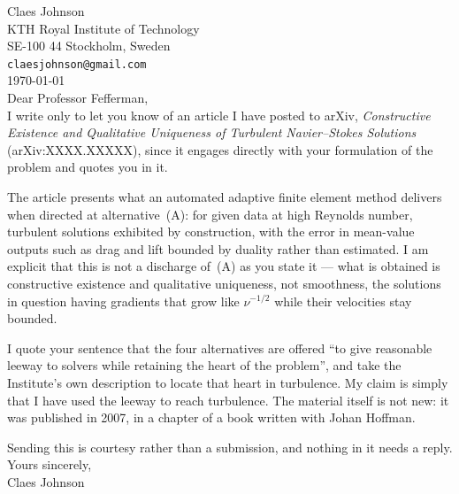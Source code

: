 \documentclass[11pt]{article}
\begin{document}
\noindent
Claes Johnson\\
KTH Royal Institute of Technology\\
SE-100 44 Stockholm, Sweden\\
\texttt{claesjohnson@gmail.com}\\[1.2em]
\today\\[1.6em]

\noindent Dear Professor Fefferman,\\[0.6em]

I write only to let you know of an article I have posted to arXiv, \emph{Constructive Existence and Qualitative Uniqueness of Turbulent Navier--Stokes Solutions}
(arXiv:XXXX.XXXXX), since it engages directly with your formulation of
the problem and quotes you in it.

The article presents what an automated adaptive finite element method delivers when directed at
alternative~(A): for given data at high Reynolds number, turbulent solutions exhibited by
construction, with the error in mean-value outputs such as drag and lift bounded by duality rather
than estimated. I am explicit that this is not a discharge of~(A) as you state it --- what is
obtained is constructive existence and qualitative uniqueness, not smoothness, the solutions in
question having gradients that grow like $\nu^{-1/2}$ while their velocities stay bounded.

I quote your sentence that the four alternatives are offered ``to give reasonable leeway to solvers
while retaining the heart of the problem'', and take the Institute's own description to locate that
heart in turbulence. My claim is simply that I have used the leeway to reach turbulence. The material
itself is not new: it was published in 2007, in a chapter of a book written with Johan Hoffman.

Sending this is courtesy rather than a submission, and nothing in it needs a reply.\\[1.2em]

\noindent Yours sincerely,\\[2em]

\noindent Claes Johnson
\end{document}

